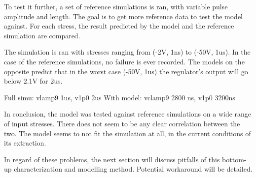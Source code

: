To test it further, a set of reference simulations is ran, with variable pulse amplitude and length.
The goal is to get more reference data to test the model against.
For each stress, the result predicted by the model and the reference simulation are compared.

The simulation is ran with stresses ranging from (-2V, 1ns) to (-50V, 1us).
In the case of the reference simulations, no failure is ever recorded.
The models on the opposite predict that in the worst case (-50V, 1us) the regulator's output will go below 2.1V for 2us.

Full simu: vlamp9 1us, v1p0 2us
With model: vclamp9 2800 ns, v1p0 3200ns

In conclusion, the model was tested against reference simulations on a wide range of input stresses.
There does not seem to be any clear correlation between the two.
The model seems to not fit the simulation at all, in the current conditions of its extraction.

In regard of these problems, the next section will discuss pitfalls of this bottom-up characterization and modelling method.
Potential workaround will be detailed.
